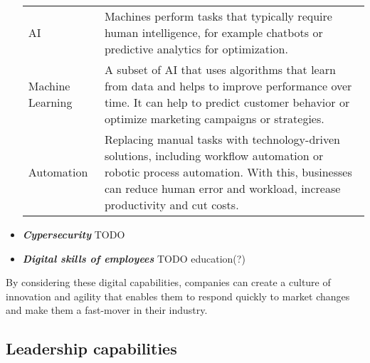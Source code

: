\documentclass[a4]{scrartcl}
\begin{document}
\begin{itemize}
\begin{tabular}{l|p{10.5cm}}
			AI & Machines perform tasks that typically require human intelligence, for example chatbots or predictive analytics for  optimization.~\cite{ai, ai2}\\
			
			Machine Learning & A subset of AI that uses algorithms that learn from data and helps to improve performance over time. It can help to predict customer behavior or optimize marketing campaigns or strategies.~\cite{ai2}\\
			
			Automation & Replacing manual tasks with technology-driven solutions, including workflow automation or robotic process automation. With this, businesses can reduce human error and workload, increase productivity and cut costs.~\cite{ai2}\\
			
		\end{tabular}
		

		
		
		
		
		\item 	\textit{\textbf{Cypersecurity}} TODO
		
		
		
		\item \textit{\textbf{Digital skills of employees}} TODO education(?)
		
		
		
	\end{itemize}
	

	By considering these digital capabilities, companies can create a culture of innovation and agility that enables them to respond quickly to market changes and make them a fast-mover in their industry.
	
	
	
	
	
	
	
	
	\subsection{Leadership capabilities} \label{subsec:leadershipcapabilities}
	
\end{document}
